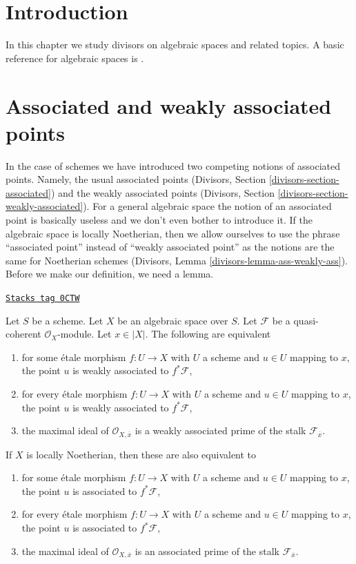 \section{Introduction}
\label{spaces-divisors-section-introduction}
In this chapter we study divisors on algebraic spaces and related topics.
A basic reference for algebraic spaces is \cite{Kn}.

\section{Associated and weakly associated points}
\label{spaces-divisors-section-associated}
In the case of schemes we have introduced two competing notions
of associated points. Namely, the usual associated points
(Divisors, Section \ref{divisors-section-associated})
and the weakly associated points
(Divisors, Section \ref{divisors-section-weakly-associated}).
For a general algebraic space the notion of an associated point
is basically useless and we don't even bother to introduce it.
If the algebraic space is locally Noetherian, then we allow ourselves
to use the phrase ``associated point'' instead of
``weakly associated point'' as the notions are the same for
Noetherian schemes (Divisors, Lemma \ref{divisors-lemma-ass-weakly-ass}).
Before we make our definition, we need a lemma.

\begin{lemma}[Associated]
\label{spaces-divisors-lemma-associated}
\href{https://stacks.math.columbia.edu/tag/0CTW}{\texttt{Stacks tag 0CTW}}

Let $S$ be a scheme. Let $X$ be an algebraic space over $S$.
Let $\mathcal{F}$ be a quasi-coherent $\mathcal{O}_X$-module.
Let $x \in |X|$. The following are equivalent
\begin{enumerate}
\item for some \'etale morphism $f : U \to X$ with $U$ a scheme
and $u \in U$ mapping to $x$, the point $u$ is weakly associated
to $f^*\mathcal{F}$,
\item for every \'etale morphism $f : U \to X$ with $U$ a scheme
and $u \in U$ mapping to $x$, the point $u$ is weakly associated
to $f^*\mathcal{F}$,
\item the maximal ideal of $\mathcal{O}_{X, \overline{x}}$
is a weakly associated prime of the stalk $\mathcal{F}_{\overline{x}}$.
\end{enumerate}
If $X$ is locally Noetherian, then these are also equivalent to
\begin{enumerate}
\item[(4)] for some \'etale morphism $f : U \to X$ with $U$ a scheme
and $u \in U$ mapping to $x$, the point $u$ is associated
to $f^*\mathcal{F}$,
\item[(5)] for every \'etale morphism $f : U \to X$ with $U$ a scheme
and $u \in U$ mapping to $x$, the point $u$ is associated
to $f^*\mathcal{F}$,
\item[(6)] the maximal ideal of $\mathcal{O}_{X, \overline{x}}$
is an associated prime of the stalk $\mathcal{F}_{\overline{x}}$.
\end{enumerate}
\end{lemma}


